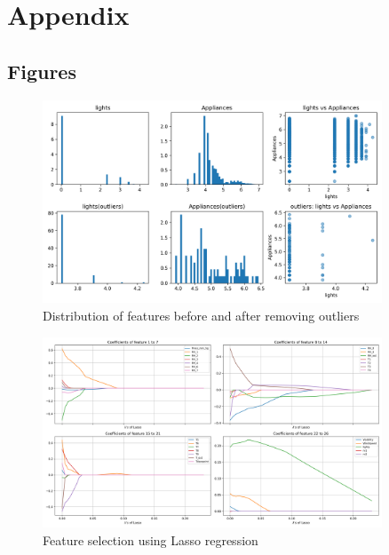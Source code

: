 \section{Appendix}

\subsection{Figures}
\begin{figure}[!h]
    \centering
    \includegraphics[width=0.9\textwidth]{../results/detect_outliers.png}
    \caption{Distribution of features before and after removing outliers}
\label{fig:skewness}
\end{figure}

\begin{figure}[!h]
    \centering
    \includegraphics[width=0.9\textwidth]{../results/lasso_select.png}
    \caption{Feature selection using Lasso regression}
    \label{fig:lasso}
\end{figure}

\newpage
